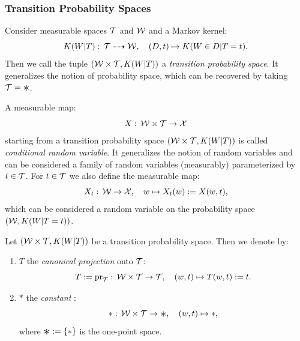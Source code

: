 \subsubsection{Transition Probability Spaces}

\begin{Def}
    Consider measurable spaces $\mathcal{T}$ and $\mathcal{W}$ and a Markov kernel:
    \[K(W|T):\, \mathcal{T} \dashrightarrow \mathcal{W},\quad (D,t) \mapsto K(W \in D|T=t).  \]
    Then we call the tuple 
    $(\mathcal{W} \times \mathcal{T}, K(W|T))$ a \emph{transition probability space}.
    It generalizes the notion of probability space, which can be recovered by taking $\Tcal=\Asterisk$.
\end{Def}




\begin{Def}
    A measurable map:
    \[ X:\, \mathcal{W} \times \mathcal{T} \to \mathcal{X}  \]
    starting from a transition probability space $(\mathcal{W}\times \mathcal{T}, K(W|T))$ is called
    \emph{conditional random variable}.
    It generalizes the notion of random variables and can be considered a family of random variables (measurably) parameterized by $t \in \mathcal{T}$.
    For $t \in \mathcal{T}$ we also define the measurable map:
    \[ X_t:\, \mathcal{W} \to \mathcal{X},\quad w \mapsto X_t(w):= X(w,t),\]
    which can be considered a random variable on the probability space $(\mathcal{W},K(W|T=t))$.
\end{Def}


\begin{Eg}
        Let $(\mathcal{W}\times \mathcal{T}, K(W|T))$ be a transition probability space.
        Then we denote by:
        \begin{enumerate}
            \item $T$ the \emph{canonical projection} onto $\mathcal{T}$:
                \[T:= \mathrm{pr}_{\mathcal{T}}:\,\mathcal{W} \times \mathcal{T} \to \mathcal{T},\quad (w,t) \mapsto T(w,t):= t.\]
            \item $\ast$ the \emph{constant \trv{}}:
                \[ \ast :\,\Wcal \times \Tcal \to \Asterisk,\quad (w,t) \mapsto \ast,\]
                where $\Asterisk:=\{\ast\}$ is the one-point space.
        \end{enumerate}
\end{Eg}




